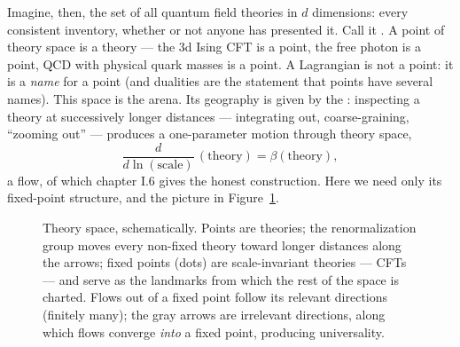 Imagine, then, the set of all quantum field theories in $d$ dimensions: every
consistent inventory, whether or not anyone has presented it. Call it
. A point of theory space is a theory --- the 3d Ising CFT
is a point, the free photon is a point, QCD with physical quark masses is a
point. A Lagrangian is not a point: it is a \emph{name} for a point (and
dualities are the statement that points have several names). This space is the
arena. Its geography is given by the : inspecting a
theory at successively longer distances --- integrating out, coarse-graining,
``zooming out'' --- produces a one-parameter motion through theory space,
\begin{equation}
\frac{d}{d\ln(\text{scale})}\,(\text{theory}) = \beta(\text{theory}),
\end{equation}
a flow, of which chapter I.6 gives the honest construction. Here we need only
its fixed-point structure, and the picture in Figure~\ref{fig:theory-space}.

\begin{figure}[t]
\centering
{}
\caption{Theory space, schematically. Points are theories; the renormalization
  group moves every non-fixed theory toward longer distances along the arrows;
  fixed points (dots) are scale-invariant theories --- CFTs --- and serve as the
  landmarks from which the rest of the space is charted. Flows out of a fixed
  point follow its relevant directions (finitely many); the gray arrows are
  irrelevant directions, along which flows converge \emph{into} a fixed point,
  producing universality.}
\label{fig:theory-space}
\end{figure}

